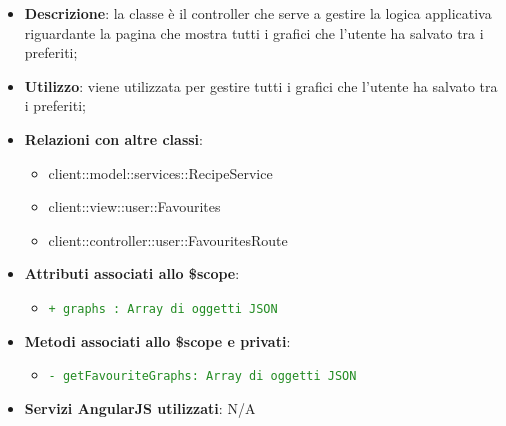 			\begin{itemize}
				\item \textbf{Descrizione}: la classe è il controller che serve a gestire la logica applicativa riguardante la pagina che mostra tutti i grafici che l'utente ha salvato tra i preferiti;
				\item \textbf{Utilizzo}: viene utilizzata per gestire tutti i grafici che l'utente ha salvato tra i preferiti;
				\item \textbf{Relazioni con altre classi}:
					\begin{itemize}
						\item client::model::services::RecipeService
						\item client::view::user::Favourites
						\item client::controller::user::FavouritesRoute
					\end{itemize}

				\item \textbf{Attributi associati allo \$scope}:
					\begin{itemize}
						\item \textcolor{forestgreen}{\texttt{+ graphs : Array di oggetti JSON}}

					\end{itemize}

				\item \textbf{Metodi associati allo \$scope e privati}:
					\begin{itemize}
						\item \textcolor{forestgreen}{\texttt{- getFavouriteGraphs: Array di oggetti JSON}}


					\end{itemize}

				\item \textbf{Servizi AngularJS utilizzati}: N/A

			\end{itemize}


